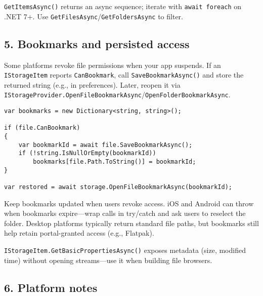 \passthrough{\lstinline!GetItemsAsync()!} returns an async sequence;
iterate with \passthrough{\lstinline!await foreach!} on .NET 7+. Use
\passthrough{\lstinline!GetFilesAsync!}/\passthrough{\lstinline!GetFoldersAsync!}
to filter.

\subsection{5. Bookmarks and persisted
access}\label{bookmarks-and-persisted-access}

Some platforms revoke file permissions when your app suspends. If an
\passthrough{\lstinline!IStorageItem!} reports
\passthrough{\lstinline!CanBookmark!}, call
\passthrough{\lstinline!SaveBookmarkAsync()!} and store the returned
string (e.g., in preferences). Later, reopen it via
\passthrough{\lstinline!IStorageProvider.OpenFileBookmarkAsync!}/\passthrough{\lstinline!OpenFolderBookmarkAsync!}.

\begin{lstlisting}
var bookmarks = new Dictionary<string, string>();

if (file.CanBookmark)
{
    var bookmarkId = await file.SaveBookmarkAsync();
    if (!string.IsNullOrEmpty(bookmarkId))
        bookmarks[file.Path.ToString()] = bookmarkId;
}

var restored = await storage.OpenFileBookmarkAsync(bookmarkId);
\end{lstlisting}

Keep bookmarks updated when users revoke access. iOS and Android can
throw when bookmarks expire---wrap calls in try/catch and ask users to
reselect the folder. Desktop platforms typically return standard file
paths, but bookmarks still help retain portal-granted access (e.g.,
Flatpak).

\passthrough{\lstinline!IStorageItem.GetBasicPropertiesAsync()!} exposes
metadata (size, modified time) without opening streams---use it when
building file browsers.

\subsection{6. Platform notes}\label{platform-notes-1}

